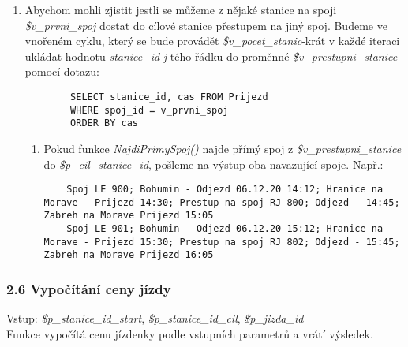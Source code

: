 \documentclass[11pt]{article}
\begin{document}
\begin{enumerate}
\begin{enumerate}
        \item Abychom mohli zjistit jestli se můžeme z nějaké stanice na spoji \textit{\$v\_prvni\_spoj} dostat do cílové stanice přestupem na jiný spoj. Budeme ve vnořeném cyklu, který se bude provádět \textit{\$v\_pocet\_stanic}-krát v každé iteraci ukládat hodnotu \textit{stanice\_id} \textit{j}-tého řádku do proměnné \textit{\$v\_prestupni\_stanice} pomocí dotazu:
        \begin{lstlisting}
        SELECT stanice_id, cas FROM Prijezd
        WHERE spoj_id = v_prvni_spoj
        ORDER BY cas
        \end{lstlisting}

        \begin{enumerate}
            \item Pokud funkce \textit{NajdiPrimySpoj()} najde přímý spoj z \textit{\$v\_prestupni\_stanice} do \textit{\$p\_cil\_stanice\_id}, pošleme na výstup oba navazující spoje. Např.:
            \begin{lstlisting}
    Spoj LE 900; Bohumin - Odjezd 06.12.20 14:12; Hranice na Morave - Prijezd 14:30; Prestup na spoj RJ 800; Odjezd - 14:45; Zabreh na Morave Prijezd 15:05
    Spoj LE 901; Bohumin - Odjezd 06.12.20 15:12; Hranice na Morave - Prijezd 15:30; Prestup na spoj RJ 802; Odjezd - 15:45; Zabreh na Morave Prijezd 16:05
            \end{lstlisting}
        \end{enumerate}
    \end{enumerate}
\end{enumerate}

\newpage

\subsubsection*{2.6 Vypočítání ceny jízdy}
Vstup: \textit{\$p\_stanice\_id\_start}, \textit{\$p\_stanice\_id\_cil}, \textit{\$p\_jizda\_id}\\
Funkce vypočítá cenu jízdenky podle vstupních parametrů a vrátí výsledek.
\end{document}
